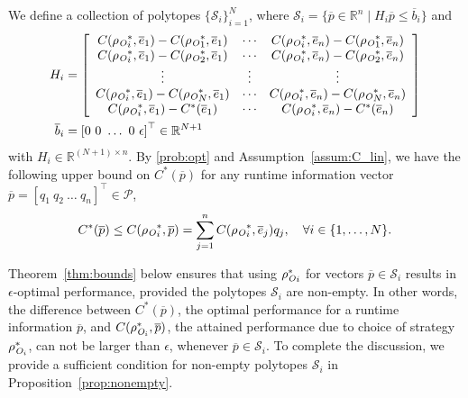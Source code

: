 We define a collection of polytopes $\{\mathcal{S}_i\}_{i=1}^N$, where $\mathcal{S}_i= \{ \overline{p} \in \mathbb{R}^n \mid H_i \overline{p}\leq
\overline{b}_i\}$ and
{\small\begin{align}
    H_i &= \left[
        \begin{array}{ccc}
            C({\rho_{\textit{O}}}_i^\ast, \overline{e}_1) -
            C({\rho_{\textit{O}}}_1^\ast, \overline{e}_1) &
            \cdots &
            C({\rho_{\textit{O}}}_i^\ast, \overline{e}_n) -
            C({\rho_{\textit{O}}}_1^\ast, \overline{e}_n)\\
            C({\rho_{\textit{O}}}_i^\ast, \overline{e}_1) -
            C({\rho_{\textit{O}}}_2^\ast, \overline{e}_1) &
            \cdots &
            C({\rho_{\textit{O}}}_i^\ast, \overline{e}_n) -
            C({\rho_{\textit{O}}}_2^\ast, \overline{e}_n)\\
            \vdots & \vdots & \vdots \\
            C({\rho_{\textit{O}}}_i^\ast, \overline{e}_1) -
            C({\rho_{\textit{O}}}_N^\ast, \overline{e}_1) &
            \cdots &
            C({\rho_{\textit{O}}}_i^\ast, \overline{e}_n) -
            C({\rho_{\textit{O}}}_N^\ast, \overline{e}_n)\\
            C({\rho_{\textit{O}}}_i^\ast, \overline{e}_1) -
            C^\ast(\overline{e}_1) &
            \cdots &
            C({\rho_{\textit{O}}}_i^\ast, \overline{e}_n) -
            C^\ast(\overline{e}_n)
    \end{array}\right] \label{eq:A_defn} \\
        \overline{b}_i&={[0\ 0\ \ldots\ 0\
        \epsilon]}^\top\in \mathbb{R}^{N+1}\label{eq:b_defn}
\end{align}}%
with $H_i\in \mathbb{R}^{(N+1)\times n}$. By \eqref{prob:opt} and Assumption~\ref{assum:C_lin}, we have the following upper bound on $C^\ast(\overline{p})$ for any runtime information vector $ \overline{p}={[q_1\ q_2\ \ldots\ q_n]}^\top\in
\mathcal{P}$,
\begin{align}
    C^\ast( \overline{p})\leq
    C({\rho_{\textit{O}}}_i^\ast,
    \overline{p})=\sum_{j=1}^nC({\rho_{\textit{O}}}_i^\ast,
    \overline{e}_j)q_j\label{eq:C_ub},\quad \forall
    i\in\{1,\ldots,N\}.
\end{align}

Theorem~\ref{thm:bounds} below ensures that using ${\rho_{\textit{O}}^\ast}_i$ for vectors $\overline p \in \mathcal{S}_i$ results in $\epsilon$-optimal performance, provided the polytopes $\mathcal{S}_i$ are non-empty. In other words, the difference between $C^\ast(\overline p)$, the optimal performance for a runtime information $\overline{p}$,  and $C(\rho_{\textit{O}_i}^\ast, \overline p)$, the attained performance due to choice of strategy $\rho_{\textit{O}_i}^\ast$,  can not be larger than $\epsilon$, whenever $\overline p \in \mathcal{S}_i$. To complete the discussion, we provide a sufficient condition for non-empty polytopes $\mathcal{S}_i$ in Proposition~\ref{prop:nonempty}.
 

